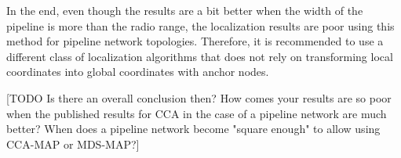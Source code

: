 In the end, even though the results are a bit better when the width of the pipeline is more than the radio range, the localization results are poor using this method for pipeline network topologies.  Therefore, it is recommended to use a different class of localization algorithms that does not rely on transforming local coordinates into global coordinates with anchor nodes.

[TODO Is there an overall conclusion then? How comes your results are so poor when the published results for CCA in the case of a pipeline network are much better? When does a pipeline network become "square enough" to allow using CCA-MAP or MDS-MAP?]
